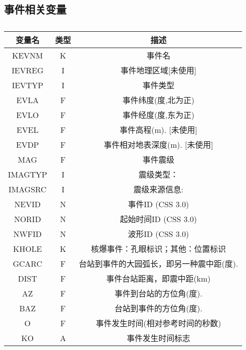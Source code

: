 \subsection{事件相关变量}
\begin{table}[H]
\centering
\caption{}
\label{}
\begin{tabular}{ccc}
    \toprule
	变量名	&	类型	&	描述\\
	\midrule
    KEVNM   &   K       &   事件名  \\
    IEVREG  &   I       &   事件地理区域[未使用]    \\
    IEVTYP  &   I       &   事件类型    \\
    EVLA    &   F       &   事件纬度(度,北为正) \\                                                                                                        
    EVLO    &   F       &   事件经度(度,东为正) \\                                  
    EVEL    &   F       &   事件高程(m). [未使用]   \\                              
    EVDP    &   F       &   事件相对地表深度(m). [未使用]   \\                   
    MAG     &   F       &   事件震级    \\                                       
    IMAGTYP &   I       &   震级类型：\\                       
    IMAGSRC &   I       &   震级来源信息:   \\
    NEVID   &   N       &   事件ID (CSS 3.0)    \\
    NORID   &   N       &   起始时间ID (CSS 3.0)    \\ 
    NWFID   &   N       &   波形ID (CSS 3.0)    \\ 
    KHOLE   &   K       &   核爆事件：孔眼标识；其他：位置标识  \\
    GCARC   &   F       &   台站到事件的大园弧长，即另一种震中距(度).\\ 
    DIST    &   F       &   事件台站距离，即震中距(km)\\                         
    AZ      &   F       &   事件到台站的方位角(度).\\                                                                                                     
    BAZ     &   F       &   台站到事件的方位角(度). \\                           
    O       &   F       &   事件发生时间(相对参考时间的秒数)    \\                                                                                        
    KO      &   A       &   事件发生时间标志    \\  
    \bottomrule
\end{tabular}
\end{table}


